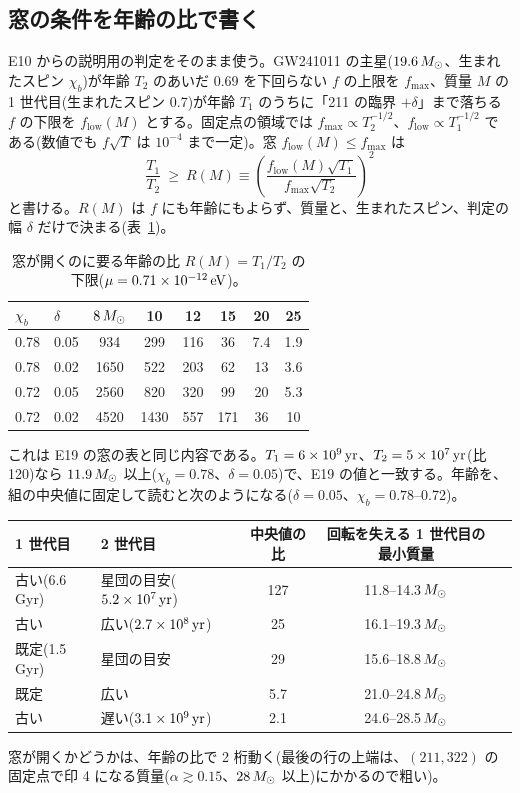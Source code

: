 \subsection{窓の条件を年齢の比で書く}

E10 からの説明用の判定をそのまま使う。GW241011 の主星($19.6\,M_\odot$、生まれたスピン $\chi_b$)が年齢 $T_2$ のあいだ 0.69 を下回らない $f$ の上限を $f_\mathrm{max}$、質量 $M$ の 1 世代目(生まれたスピン 0.7)が年齢 $T_1$ のうちに「211 の臨界 $+\delta$」まで落ちる $f$ の下限を $f_\mathrm{low}(M)$ とする。固定点の領域では $f_\mathrm{max}\propto T_2^{-1/2}$、$f_\mathrm{low}\propto T_1^{-1/2}$ である(数値でも $f\sqrt T$ は $10^{-4}$ まで一定)。窓 $f_\mathrm{low}(M)\le f_\mathrm{max}$ は
\begin{equation}
\frac{T_1}{T_2}\ \ge\ R(M)\equiv\left(\frac{f_\mathrm{low}(M)\sqrt{T_1}}{f_\mathrm{max}\sqrt{T_2}}\right)^2
\label{eq:e22R}
\end{equation}
と書ける。$R(M)$ は $f$ にも年齢にもよらず、質量と、生まれたスピン、判定の幅 $\delta$ だけで決まる(表~\ref{tab:e22R})。

\begin{table}[H]
\centering\small
\begin{tabular}{llcccccc}
\toprule
$\chi_b$ & $\delta$ & $8\,M_\odot$ & 10 & 12 & 15 & 20 & 25\\
\midrule
0.78 & 0.05 & 934 & 299 & 116 & 36 & 7.4 & 1.9\\
0.78 & 0.02 & 1650 & 522 & 203 & 62 & 13 & 3.6\\
0.72 & 0.05 & 2560 & 820 & 320 & 99 & 20 & 5.3\\
0.72 & 0.02 & 4520 & 1430 & 557 & 171 & 36 & 10\\
\bottomrule
\end{tabular}
\caption{窓が開くのに要る年齢の比 $R(M)=T_1/T_2$ の下限($\mu=0.71\times10^{-12}\,\mathrm{eV}$)。}
\label{tab:e22R}
\end{table}

これは E19 の窓の表と同じ内容である。$T_1=6\times10^9\,\mathrm{yr}$、$T_2=5\times10^7\,\mathrm{yr}$(比 120)なら $11.9\,M_\odot$ 以上($\chi_b=0.78$、$\delta=0.05$)で、E19 の値と一致する。年齢を、組の中央値に固定して読むと次のようになる($\delta=0.05$、$\chi_b=0.78$--0.72)。
\begin{center}\small
\begin{tabular}{llccc}
\toprule
1 世代目 & 2 世代目 & 中央値の比 & 回転を失える 1 世代目の最小質量\\
\midrule
古い(6.6 Gyr) & 星団の目安($5.2\times10^7\,\mathrm{yr}$) & 127 & 11.8--14.3$\,M_\odot$\\
古い & 広い($2.7\times10^8\,\mathrm{yr}$) & 25 & 16.1--19.3$\,M_\odot$\\
既定(1.5 Gyr) & 星団の目安 & 29 & 15.6--18.8$\,M_\odot$\\
既定 & 広い & 5.7 & 21.0--24.8$\,M_\odot$\\
古い & 遅い($3.1\times10^9\,\mathrm{yr}$) & 2.1 & 24.6--28.5$\,M_\odot$\\
\bottomrule
\end{tabular}
\end{center}
窓が開くかどうかは、年齢の比で 2 桁動く(最後の行の上端は、$(211,322)$ の固定点で印 4 になる質量($\alpha\gtrsim0.15$、$28\,M_\odot$ 以上)にかかるので粗い)。

